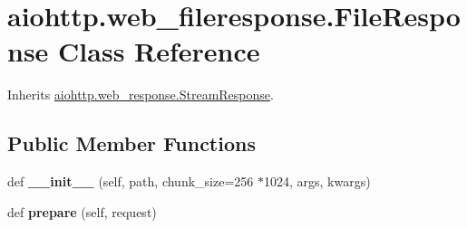 \hypertarget{classaiohttp_1_1web__fileresponse_1_1_file_response}{}\section{aiohttp.\+web\+\_\+fileresponse.\+File\+Response Class Reference}
\label{classaiohttp_1_1web__fileresponse_1_1_file_response}


Inherits \hyperlink{classaiohttp_1_1web__response_1_1_stream_response}{aiohttp.\+web\+\_\+response.\+Stream\+Response}.

\subsection*{Public Member Functions}
\begin{DoxyCompactItemize}
\item 
\mbox{\label{classaiohttp_1_1web__fileresponse_1_1_file_response_a94000453ecce69b06e3288cfd81fae23}} 
def {\bfseries \+\_\+\+\_\+init\+\_\+\+\_\+} (self, path, chunk\+\_\+size=256 $\ast$1024, args, kwargs)
\item 
\mbox{\label{classaiohttp_1_1web__fileresponse_1_1_file_response_a4dc631eece40a5733d320a13177ef2be}} 
def {\bfseries prepare} (self, request)
\end{DoxyCompactItemize}
